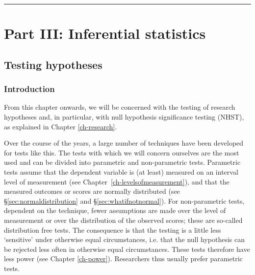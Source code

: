 \documentclass[
]{book}
\begin{document}
\begin{center}\rule{0.5\linewidth}{0.5pt}\end{center}

\part*{Part III: Inferential statistics}\label{part-part-iii-inferential-statistics}

\chapter{Testing hypotheses}\label{ch-testing}

\section{Introduction}\label{sec:testing-introduction}

From this chapter onwards, we will be concerned with the testing of
research hypotheses and, in particular, with null hypothesis significance testing (NHST),
as explained in Chapter \ref{ch-research}.

Over the course of the years, a large number of techniques have been developed
for tests like this. The tests with which we will concern ourselves
are the most used and can be divided into parametric
and non-parametric tests. Parametric tests assume that the dependent
variable is (at least) measured on an interval level of measurement (see
Chapter~\ref{ch-levelsofmeasurement}), and that the measured outcomes or
scores are normally distributed (see
§\ref{sec:normaldistribution} and §\ref{sec:whatifnotnormal}).
For non-parametric tests, dependent on the technique,
fewer assumptions are made over the level of measurement or over
the distribution of the observed scores; these are so-called
distribution free tests. The consequence is that the testing
is a little less `sensitive' under otherwise equal circumstances, i.e.
that the null hypothesis can be rejected less often in
otherwise equal circumstances. These tests therefore have less power (see
Chapter \ref{ch-power}). Researchers thus usually prefer parametric
tests.
\end{document}
